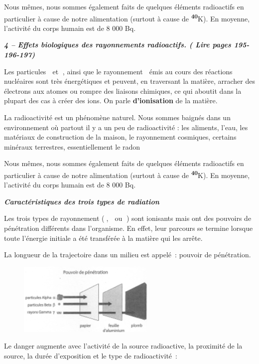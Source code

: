 Nous mêmes, nous sommes également faits de quelques éléments radioactifs
en particulier à cause de notre alimentation (surtout à cause de
\textsuperscript{\textbf{40}}K). En moyenne, l'activité du corps humain
est de 8 000 Bq.

\emph{\textbf{4 --} \textbf{Effets biologiques des rayonnements
radioactifs. ( Lire pages 195-196-197)}}

Les particules  et , ainsi que le rayonnement  émis au cours des
réactions nucléaires sont très énergétiques et peuvent, en traversant la
matière, arracher des électrons aux atomes ou rompre des liaisons
chimiques, ce qui aboutit dans la plupart des cas à créer des ions. On
parle \textbf{d'ionisation }de la matière.

La radioactivité est un phénomène naturel. Nous sommes baignés dans un
environnement où partout il y a un peu de radioactivité : les aliments,
l'eau, les matériaux de construction de la maison, le rayonnement
cosmiques, certains minéraux terrestres, essentiellement le radon

Nous mêmes, nous sommes également faits de quelques éléments radioactifs
en particulier à cause de notre alimentation (surtout à cause de
\textsuperscript{\textbf{40}}K). En moyenne, l'activité du corps humain
est de 8 000 Bq.

\emph{\textbf{Caractéristiques des trois types de radiation}}

Les trois types de rayonnement (,  ou ) sont ionisants mais ont des
pouvoirs de pénétration différents dans l'organisme. En effet, leur
parcours se termine lorsque toute l'énergie initiale a été transférée à
la matière qui les arrête.

La longueur de la trajectoire dans un milieu est appelé~: pouvoir de
pénétration.

\begin{figure}
\centering
\includegraphics[width=6.574cm,height=3.461cm]{Pictures/10000001000000DA0000007380CB3B303A836040.png}
\caption{}
\end{figure}

Le danger augmente avec l'activité de la source radioactive, la
proximité de la source, la durée d'exposition et le type de
radioactivité~:

